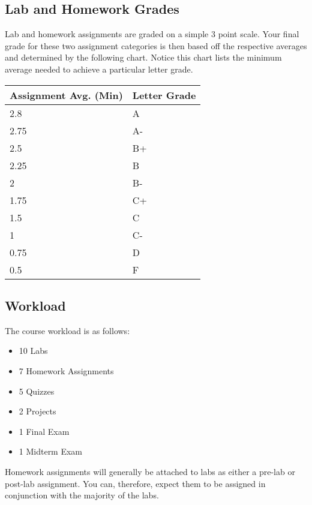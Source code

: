 \documentclass[10pt]{article}
\begin{document}
\subsection{Lab and Homework Grades}

Lab and homework assignments are graded on a simple 3 point scale.  Your final grade for these two assignment categories is then based off the respective averages and determined by the following chart.  Notice this chart lists the minimum average needed to achieve a particular letter grade.  

\begin{center}
\begin{small}
\begin{tabular}{ll}
Assignment Avg. (Min) & Letter Grade \\ \hline
2.8   & A  \\
2.75    & A- \\
2.5 & B+ \\
2.25    & B  \\ 
2   & B- \\
1.75    & C+ \\
1.5 & C  \\
1   & C- \\
0.75    & D  \\
0.5  & F 
\end{tabular}
\end{small}
\end{center}



\subsection{Workload}
The course workload is as follows:
\begin{itemize}
\item 10 Labs
\item 7 Homework Assignments
\item 5 Quizzes
\item 2 Projects
\item 1 Final Exam
\item 1 Midterm Exam
\end{itemize}

Homework assignments will generally be attached to labs as either a pre-lab or post-lab assignment. You can, therefore, expect them to be assigned in conjunction with the majority of the labs.
\end{document}
